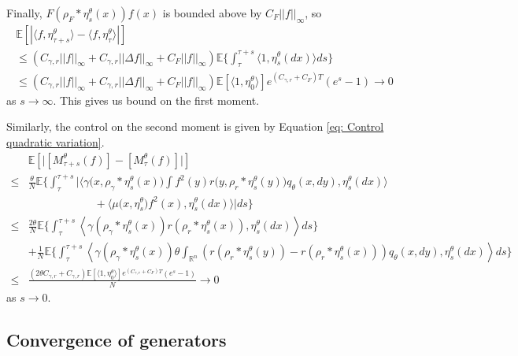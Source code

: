 \documentclass[12pt]{article}
\begin{document}
Finally,  $F(\rho_{F}*\eta^{\theta}_{s}(x)) f(x)$ is bounded above by $C_F||f||_{\infty}$, so 
\begin{multline}
\mathbb{E}\left[\left| \langle f, \eta^{\theta}_{\tau+s}\rangle - \langle f, \eta^{\theta}_{\tau}\rangle \right|\right] \\
\leq (C_{\gamma,r}||f||_{\infty} + C_{\gamma,r}||\Delta f||_{\infty}+C_F||f||_{\infty}) \mathbb{E}\bigg\{\int_{\tau}^{\tau+s}\bigg\langle 1,\eta^{\theta}_{s}(dx)  \bigg\rangle  ds\bigg\} \\
\leq (C_{\gamma,r}||f||_{\infty} + C_{\gamma,r}||\Delta f||_{\infty}+C_F||f||_{\infty}) \mathbb{E}[\langle 1 ,\eta^{\theta}_{0}\rangle]e^{(C_{\gamma,r}+C_F)T}(e^s-1)\to 0
\end{multline}
as $s \to \infty$. 
This gives us bound on the first moment.


Similarly, the control on the second moment is given by Equation \eqref{eq: Control quadratic variation}.
\begin{equation}
    \label{eq: Controlling Quadratic Jumps}
\begin{aligned}
& \mathbb{E}\left[\big| [M^{\theta}_{\tau+s}(f)] - [M^{\theta}_{\tau}(f)] \big|\right]\\
\leq &\frac{\theta}{N} \mathbb{E} \Bigg\{ \int_{\tau}^{\tau+s}\bigg|
\langle \gamma\big(x,\rho_{\gamma}*\eta^{\theta}_{s}(x)\big)
\int f^2(y)r\big(y,\rho_{r}*\eta^{\theta}_{s}(y)\big)q_\theta(x,dy) 
,\eta^{\theta}_{s}(dx)\rangle\\
& \qquad \qquad \qquad +\langle \mu\big(x,\eta^{\theta}_{s}\big)f^2(x) 
,\eta^{\theta}_{s}(dx)\rangle \bigg|ds \Bigg\}\\
\leq & \frac{2\theta}{N}\mathbb{E} \Bigg\{\int_{\tau}^{\tau+s} \left\langle \gamma(\rho_{\gamma}*\eta^{\theta}_{s}(x))r(\rho_{r}*\eta^{\theta}_{s}(x)), \eta^{\theta}_{s}(dx) \right\rangle ds\Bigg\} \\
& + \frac{1}{N}\mathbb{E} \Bigg\{\int_{\tau}^{\tau+s} \left\langle \gamma (\rho_{\gamma}*\eta^{\theta}_{s}(x))\theta\int_{\mathbb{R}^n}\left(r(\rho_{r}*\eta^{\theta}_{s}(y))-r(\rho_{r}*\eta^{\theta}_{s}(x))\right) q_\theta(x,dy), \eta^{\theta}_{s}(dx) \right\rangle ds\Bigg\}\\
\leq & \frac{(2 \theta C_{\gamma,r}+C_{\gamma,r})\mathbb{E}[\langle 1 ,\eta^{\theta}_{0}\rangle]e^{(C_{\gamma,r}+C_F)T}(e^s-1)}{N} \to 0
\end{aligned}
\end{equation}
as $s \to 0$.


\subsection{Convergence of generators}
    \label{sec:population_generators_proofs}
\end{document}
